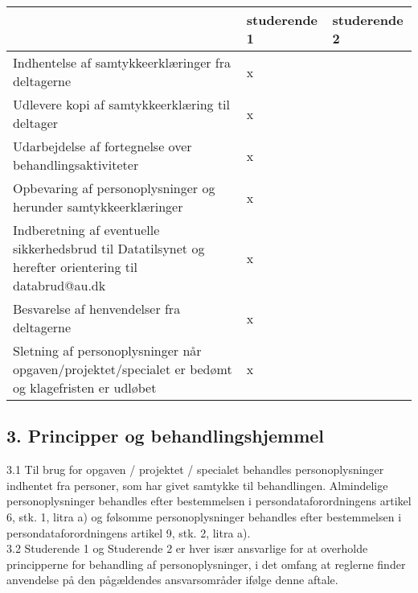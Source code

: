 \documentclass[11pt, a4paper]{article}
\begin{document}
\begin{table}[]

\begin{tabular}{ | p{} | l | l | }
\hline
                                                                                                      & studerende 1 & studerende 2 \\ \hline
Indhentelse af samtykkeerklæringer fra deltagerne                                                     &      x        &              \\ \hline
Udlevere kopi af samtykkeerklæring til deltager                                                       &      x        &              \\ \hline
Udarbejdelse af fortegnelse over behandlingsaktiviteter                                               &      x        &              \\ \hline
Opbevaring af personoplysninger og herunder samtykkeerklæringer                                       &      x        &              \\ \hline
Indberetning af eventuelle sikkerhedsbrud til Datatilsynet og herefter orientering til databrud@au.dk &      x        &              \\ \hline
Besvarelse af henvendelser fra deltagerne                                                             &      x        &              \\ \hline
Sletning af personoplysninger når opgaven/projektet/specialet er bedømt og klagefristen er udløbet    &      x        &              \\ \hline
\end{tabular}%

\end{table}

\subsection*{3. Principper og behandlingshjemmel} 

3.1 Til brug for opgaven / projektet / specialet behandles personoplysninger indhentet fra personer, som har givet samtykke til behandlingen. Almindelige personoplysninger behandles efter bestemmelsen i persondataforordningens artikel 6, stk. 1, litra a) og følsomme personoplysninger behandles efter bestemmelsen i persondataforordningens artikel 9, stk. 2, litra a).\\

3.2 Studerende 1 og Studerende 2 er hver især ansvarlige for at overholde principperne for behandling af personoplysninger, i det omfang at reglerne finder anvendelse på den pågældendes ansvarsområder ifølge denne aftale.
\end{document}
